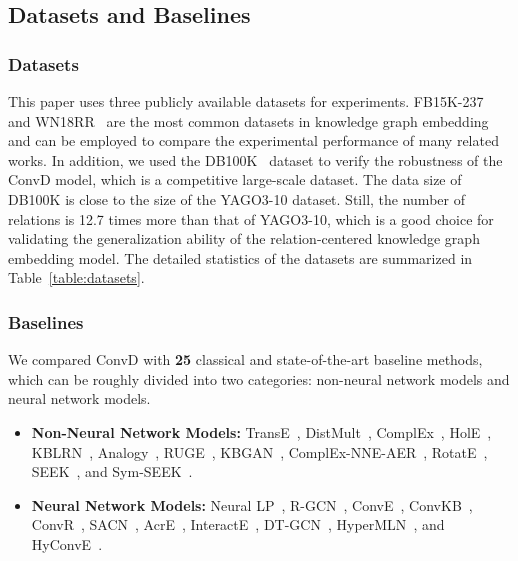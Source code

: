 \documentclass[letterpaper]{article} %
\begin{document}
\subsection{Datasets and Baselines}
\subsubsection{Datasets}
This paper uses three publicly available datasets for experiments. FB15K-237~\cite{FB15K237} and WN18RR~\cite{WN18RR} are the most common datasets in knowledge graph embedding and can be employed to compare the experimental performance of many related works. In addition, we used the DB100K~\cite{DB100K} dataset to verify the robustness of the ConvD model, which is a competitive large-scale dataset. The data size of DB100K is close to the size of the YAGO3-10 dataset. Still, the number of relations is 12.7 times more than that of YAGO3-10, which is a good choice for validating the generalization ability of the relation-centered knowledge graph embedding model. The detailed statistics of the datasets are summarized in Table~\ref{table:datasets}.
\begin{table}[h]
  \centering
  \caption{The detailed statistics of the datasets.}
  \label{table:datasets}
\end{table}

\subsubsection{Baselines}
We compared ConvD with \textbf{25} classical and state-of-the-art baseline methods, which can be roughly divided into two categories: non-neural network models and neural network models.
\begin{itemize}
    \item \textbf{Non-Neural Network Models:} TransE~\cite{TransE}, DistMult~\cite{DistMult}, ComplEx~\cite{ComplEx}, HolE~\cite{HolE}, KBLRN~\cite{KBLRN}, Analogy~\cite{Analogy}, RUGE~\cite{RUGE}, KBGAN~\cite{KBGAN}, ComplEx-NNE-AER~\cite{NNE-AER}, RotatE~\cite{RotatE}, SEEK~\cite{SEEK}, and Sym-SEEK~\cite{SEEK}.
    \item \textbf{Neural Network Models:} Neural LP~\cite{NeuralLP}, R-GCN~\cite{RGCN}, ConvE~\cite{ConvE}, ConvKB~\cite{ConvKB}, ConvR~\cite{ConvR}, SACN~\cite{SACN}, AcrE~\cite{AcrE}, InteractE~\cite{InteractE}, DT-GCN~\cite{DT-GCN}, HyperMLN~\cite{HyperMLN}, and HyConvE~\cite{HyConvE}.
\end{itemize}
\end{document}
